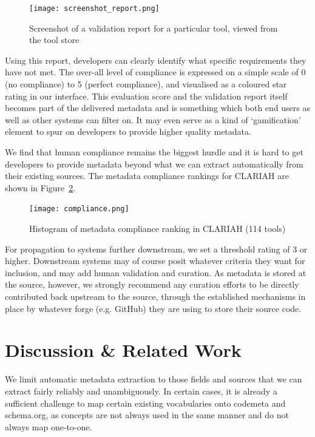 \documentclass[a4paper,11pt]{article}
\begin{document}
\begin{figure}[h]
\begin{center}
\texttt{[image: screenshot\_report.png]}
\caption{Screenshot of a validation report for a particular tool, viewed from the tool store}
\label{fig:validationreport}
\end{center}
\end{figure}

Using this report, developers can clearly identify what specific requirements
they have not met. The over-all level of compliance is expressed on a simple
scale of 0 (no compliance) to 5 (perfect compliance), and visualised as a
coloured star rating in our interface. This evaluation score and the validation
report itself becomes part of the delivered metadata and is something which
both end users as well as other systems can filter on. It may even serve as a
kind of `gamification' element to spur on developers to provide higher quality
metadata.

We find that human compliance remains the biggest hurdle and it is hard to get
developers to provide metadata beyond what we can extract automatically from
their existing sources. The metadata compliance rankings for CLARIAH are shown
in Figure~\ref{fig:compliance}.

\begin{figure}[h!]
\begin{center}
\texttt{[image: compliance.png]}
\caption{Histogram of metadata compliance ranking in CLARIAH (114 tools)}
\end{center}
\label{fig:compliance}
\end{figure}

For propagation to systems further downstream, we set a threshold rating of 3
or higher. Downstream systems may of course posit whatever criteria they want
for inclusion, and may add human validation and curation. As metadata is stored
at the source, however, we strongly recommend any curation efforts to be
directly contributed back upstream to the source, through the established mechanisms
in place by whatever forge (e.g. GitHub) they are using to store their source
code.

\section{Discussion \& Related Work}

We limit automatic metadata extraction to those fields and sources that we can
extract fairly reliably and unambiguously. In certain cases, it is already a
sufficient challenge to map certain existing vocabularies onto codemeta and
schema.org, as concepts are not always used in the same manner and do not always
map one-to-one.
\end{document}
